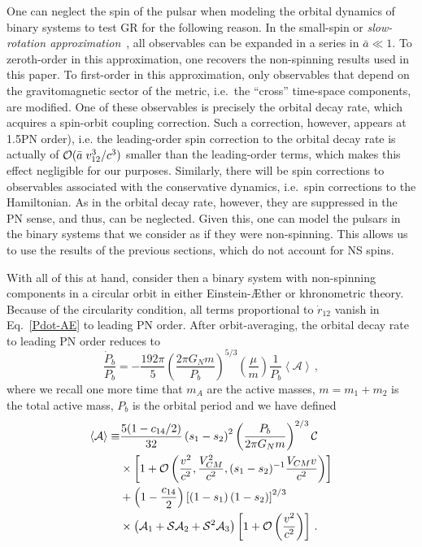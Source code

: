 \documentclass[prd,aps,twocolumn,nofootinbib,showpacs,superscriptaddress]{revtex4-1}
\newcommand\be{\begin{equation}}
\newcommand\ee{\end{equation}}
\def\m{\mu}
\newcommand{\nn}{\nonumber}
\begin{document}
One can neglect the spin of the pulsar when modeling the orbital dynamics of binary systems to test GR for the following reason. In the small-spin or {\textit{slow-rotation approximation}}~\cite{Hartle:1967ha,Hartle:1969ht,Hartle:1970ha,Hartle:1973ha}, all observables can be expanded in a series in $\bar{a} \ll 1$. To zeroth-order in this approximation, one recovers the non-spinning results used in this paper. To first-order in this approximation, only observables that depend on the gravitomagnetic sector of the metric, i.e.~the ``cross'' time-space components, are modified. One of these observables is precisely the orbital decay rate, which acquires a spin-orbit coupling correction. Such a correction, however, appears at 1.5PN order), i.e. the leading-order spin correction to the orbital decay rate is actually of ${\cal{O}}(\bar{a} \; v_{12}^{3}/c^3)$ smaller than the leading-order terms, which makes this effect negligible for our purposes. Similarly, there will be spin corrections to observables associated 
with the conservative dynamics, i.e.~spin corrections to the Hamiltonian. As in the orbital decay rate, however, they are suppressed in the PN sense, and thus, can be neglected. Given this, one can model the pulsars in the binary systems that we consider as if they were non-spinning. This allows us to use the results of the previous sections, which do not account for NS spins.

With all of this at hand, consider then a binary system with non-spinning components in a circular orbit in either Einstein-\AE ther or khronometric theory. Because of the circularity condition, all terms proportional to $\dot{r}_{12}$ vanish in Eq.~\eqref{Pdot-AE} to leading PN order. 
%
After orbit-averaging, the orbital decay rate to leading PN order reduces to
%
\be
\frac{\dot{P}_{b}}{P_{b}} = - \frac{192 \pi}{5} \left(\frac{2 \pi G_{N} m}{P_{b}}\right)^{5/3} \left(\frac{\m}{m}\right) \frac{1}{P_{b}} \left<\mathcal{A}\right>\,,
\label{flux-AE}
\ee
%
where we recall one more time that $m_{A}$ are the active masses, $m = m_{1} + m_{2}$ is the total active mass, $P_{b}$ is the orbital period and we have defined
%
\begin{align}
\label{A-AE}
\left<\mathcal{A}\right> \equiv &
\frac{5(1-c_{14}/2)}{32} \left(s_1 - s_2\right)^2  \left( \frac{P_b}{2 \pi G_N m} \right)^{2/3} \mathcal{C} 
\nn \\
& \times \left[ 1 + {\cal{O}} \left( \frac{v^{2}}{c^{2}}, \frac{V_{CM}^{2}}{c^{2}},(s_{1}-s_{2})^{-1} \frac{V_{CM} v}{c^{2}} \right) \right]
\nn \\
&+  \left( 1-\frac{c_{14}}{2} \right)\left[\left(1 - s_{1}\right) \left(1 - s_{2}\right)\right]^{2/3}  
\nn \\
&\times
\left( \mathcal{A}_1 + \mathcal{S} \mathcal{A}_2 + \mathcal{S}^{2} \mathcal{A}_3  \right) \left[ 1 + {\cal{O}} \left( \frac{v^{2}}{c^{2}} \right) \right]\,.
\end{align}
%
\end{document}

